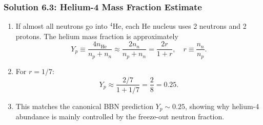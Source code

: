 \subsubsection*{Solution 6.3: Helium-4 Mass Fraction Estimate}

\begin{enumerate}[label=(\alph*)]
  \item If almost all neutrons go into ${}^4\mathrm{He}$, each He nucleus uses 2 neutrons and 2 protons. The helium mass fraction is approximately
  \[
    Y_p \equiv \frac{4n_{\mathrm{He}}}{n_p+n_n}
    \approx \frac{2n_n}{n_p+n_n}
    = \frac{2r}{1+r},\quad r\equiv\frac{n_n}{n_p}.
  \]

  \item For $r=1/7$:
  \[
    Y_p \approx \frac{2/7}{1+1/7}=\frac{2}{8}=0.25.
  \]

  \item This matches the canonical BBN prediction $Y_p\sim 0.25$, showing why helium-4 abundance is mainly controlled by the freeze-out neutron fraction.
\end{enumerate}




  




